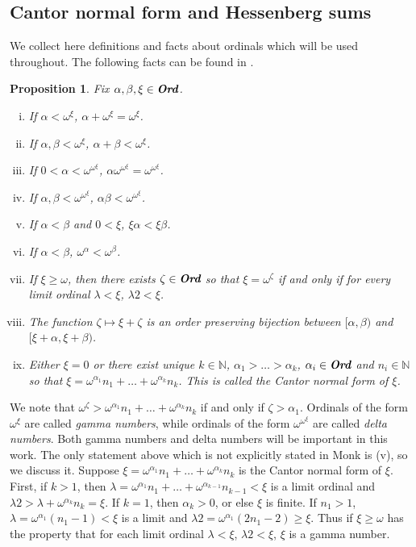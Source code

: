 \documentclass[12pt]{amsart}
\newtheorem{proposition}[theorem]{Proposition}
\theoremstyle{definition}
\newcommand{\ord}{\textbf{Ord}}
\newcommand{\nn}{\mathbb{N}}
\begin{document}
\subsection{Cantor normal form and Hessenberg sums} 



We collect here definitions and facts about ordinals which will be used throughout. The following facts can be found in \cite{Monk}.  

\begin{proposition} Fix $\alpha, \beta, \xi\in \emph{\ord}$.   \begin{enumerate}[(i)]\item If  $\alpha<\omega^\xi$, $\alpha+\omega^\xi= \omega^\xi$.  \item If $\alpha, \beta<\omega^\xi$, $\alpha+\beta<\omega^\xi$. \item If $0<\alpha<\omega^{\omega^\xi}$, $\alpha\omega^{\omega^\xi}=\omega^{\omega^\xi}$.  \item If $\alpha, \beta<\omega^{\omega^\xi}$, $\alpha\beta<\omega^{\omega^\xi}$. \item If $\alpha<\beta$ and $0<\xi$, $\xi\alpha<\xi\beta$.  \item If $\alpha<\beta$, $\omega^\alpha<\omega^\beta$.  \item If $\xi\geqslant \omega$, then there exists $\zeta\in \emph{\ord}$ so that $\xi=\omega^\zeta$ if and only if for every limit ordinal $\lambda<\xi$, $\lambda 2<\xi$.  \item The function $\zeta\mapsto \xi+\zeta$ is an order preserving bijection between $[\alpha, \beta)$ and $[\xi+\alpha, \xi+\beta)$.  \item Either $\xi=0$ or there exist unique $k\in \nn$, $\alpha_1>\ldots>\alpha_k$, $\alpha_i\in \emph{\ord}$ and $n_i\in \nn$ so that $\xi=\omega^{\alpha_1}n_1+\ldots + \omega^{\alpha_k}n_k$.  This is called the \emph{Cantor normal form} of $\xi$.  

\end{enumerate}




\label{ordinals}
\end{proposition}




We note that $\omega^\zeta> \omega^{\alpha_1}n_1+\ldots + \omega^{\alpha_k}n_k$ if and only if $\zeta>\alpha_1$. Ordinals of the form $\omega^\xi$ are called \emph{gamma numbers}, while ordinals of the form $\omega^{\omega^\xi}$ are called \emph{delta numbers}.  Both gamma numbers and delta numbers will be important in this work.  The only statement above which is not explicitly stated in Monk is (v), so we discuss it.  Suppose $\xi=\omega^{\alpha_1}n_1+\ldots+\omega^{\alpha_k}n_k$ is the Cantor normal form of $\xi$.  First, if $k>1$, then $\lambda=\omega^{\alpha_1}n_1+\ldots+\omega^{\alpha_{k-1}}n_{k-1}<\xi$ is a limit ordinal and $\lambda 2>\lambda + \omega^{\alpha_k}n_k=\xi$.  If $k=1$, then $\alpha_k>0$, or else $\xi$ is finite.  If $n_1>1$, $\lambda=\omega^{\alpha_1}(n_1-1)<\xi$ is a limit and $\lambda 2 = \omega^{\alpha_1}(2n_1-2)\geqslant \xi$.  Thus if $\xi\geqslant \omega$ has the property that for each limit ordinal $\lambda <\xi$, $\lambda 2<\xi$, $\xi$ is a gamma number.  
\end{document}
